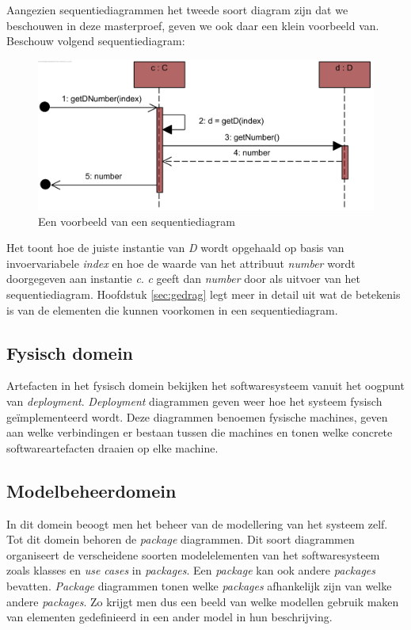 Aangezien sequentiediagrammen het tweede soort diagram zijn dat we beschouwen in deze masterproef, geven we ook daar een klein voorbeeld van. Beschouw volgend sequentiediagram:

\begin{figure}[H]
	\label{fig:sd}
	\centering
	\includegraphics{intro/sd.png}
	\caption{Een voorbeeld van een sequentiediagram}
\end{figure}

Het toont hoe de juiste instantie van \textit{D} wordt opgehaald op basis van invoervariabele \textit{index} en hoe de waarde van het attribuut \textit{number} wordt doorgegeven aan instantie \textit{c}. \textit{c} geeft dan \textit{number} door als uitvoer van het sequentiediagram. Hoofdstuk \ref{sec:gedrag} legt meer in detail uit wat de betekenis is van de elementen die kunnen voorkomen in een sequentiediagram.

\subsection{Fysisch domein}

Artefacten in het fysisch domein bekijken het softwaresysteem vanuit het oogpunt van \textit{deployment}. \textit{Deployment} diagrammen geven weer hoe het systeem fysisch ge\"implementeerd wordt. Deze diagrammen benoemen fysische machines, geven aan welke verbindingen er bestaan tussen die machines en tonen welke concrete softwareartefacten draaien op elke machine.

\subsection{Modelbeheerdomein}

In dit domein beoogt men het beheer van de modellering van het systeem zelf. Tot dit domein behoren de \textit{package} diagrammen. Dit soort diagrammen organiseert de verscheidene soorten modelelementen van het softwaresysteem zoals klasses en \textit{use cases} in \textit{packages}. Een \textit{package} kan ook andere \textit{packages} bevatten. \textit{Package} diagrammen tonen welke \textit{packages} afhankelijk zijn van welke andere \textit{packages}. Zo krijgt men dus een beeld van welke modellen gebruik maken van elementen gedefinieerd in een ander model in hun beschrijving.

